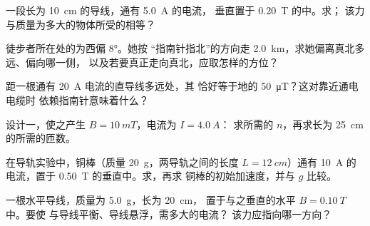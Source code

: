 \begin{exercise}[$\star$]\label{exo:g11:magnetic-fields:5}
一段长为 \qty{10}{cm} 的导线，通有 \qty{5.0}{A} 的电流，
垂直置于 \qty{0.20}{T} 的中。求；
该力与质量为多大的物体所受的相等？
\end{exercise}

\begin{exercise}[$\star\star$]\label{exo:g11:magnetic-fields:6}
徒步者所在处的为西偏 $\ang{8}$。她按
“指南针指北”的方向走 \qty{2.0}{km}，求她偏离真北多远、偏向哪一侧，
以及若要真正走向真北，应取怎样的方位？
\end{exercise}

\begin{exercise}[$\star\star$]\label{exo:g11:magnetic-fields:7}
距一根通有 \qty{20}{A} 电流的直导线多远处，其
恰好等于地的 \qty{50}{\micro T}？这对靠近通电电缆时
依赖指南针意味着什么？
\end{exercise}

\begin{exercise}[$\star\star$]\label{exo:g11:magnetic-fields:8}
设计一，使之产生 $B = \qty{10}{mT}$，电流为 $I = \qty{4.0}{A}$：
求所需的 $n$，再求长为 \qty{25}{cm} 的所需的匝数。
\end{exercise}

\begin{exercise}[$\star\star$]\label{exo:g11:magnetic-fields:9}
在导轨实验中，铜棒（质量 \qty{20}{g}，两导轨之间的长度
$L = \qty{12}{cm}$）通有 \qty{10}{A} 的电流，置于
\qty{0.50}{T} 的垂直中。求，再求
铜棒的初始加速度，并与 $g$ 比较。
\end{exercise}

\begin{exercise}[$\star\star$]\label{exo:g11:magnetic-fields:10}
一根水平导线，质量为 \qty{5.0}{g}，长为 \qty{20}{cm}，
置于与之垂直的水平 $B = \qty{0.10}{T}$ 中。要使
与导线平衡、导线悬浮，需多大的电流？
该力应指向哪一方向？
\end{exercise}

